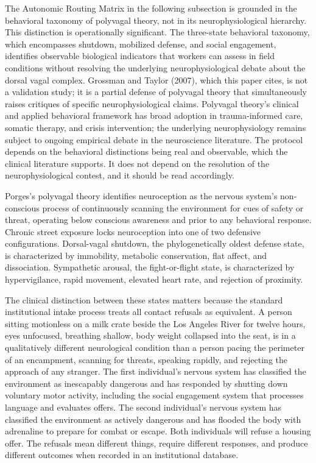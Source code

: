 \documentclass[12pt, letterpaper]{article}
\begin{document}
The Autonomic Routing Matrix in the following subsection is grounded in the behavioral taxonomy of polyvagal theory, not in its neurophysiological hierarchy. This distinction is operationally significant. The three-state behavioral taxonomy, which encompasses shutdown, mobilized defense, and social engagement, identifies observable biological indicators that workers can assess in field conditions without resolving the underlying neurophysiological debate about the dorsal vagal complex. Grossman and Taylor (2007), which this paper cites, is not a validation study; it is a partial defense of polyvagal theory that simultaneously raises critiques of specific neurophysiological claims. Polyvagal theory's clinical and applied behavioral framework has broad adoption in trauma-informed care, somatic therapy, and crisis intervention; the underlying neurophysiology remains subject to ongoing empirical debate in the neuroscience literature. The protocol depends on the behavioral distinctions being real and observable, which the clinical literature supports. It does not depend on the resolution of the neurophysiological contest, and it should be read accordingly.

Porges's polyvagal theory identifies neuroception as the nervous system's non-conscious process of continuously scanning the environment for cues of safety or threat, operating below conscious awareness and prior to any behavioral response. Chronic street exposure locks neuroception into one of two defensive configurations. Dorsal-vagal shutdown, the phylogenetically oldest defense state, is characterized by immobility, metabolic conservation, flat affect, and dissociation. Sympathetic arousal, the fight-or-flight state, is characterized by hypervigilance, rapid movement, elevated heart rate, and rejection of proximity.

The clinical distinction between these states matters because the standard institutional intake process treats all contact refusals as equivalent. A person sitting motionless on a milk crate beside the Los Angeles River for twelve hours, eyes unfocused, breathing shallow, body weight collapsed into the seat, is in a qualitatively different neurological condition than a person pacing the perimeter of an encampment, scanning for threats, speaking rapidly, and rejecting the approach of any stranger. The first individual's nervous system has classified the environment as inescapably dangerous and has responded by shutting down voluntary motor activity, including the social engagement system that processes language and evaluates offers. The second individual's nervous system has classified the environment as actively dangerous and has flooded the body with adrenaline to prepare for combat or escape. Both individuals will refuse a housing offer. The refusals mean different things, require different responses, and produce different outcomes when recorded in an institutional database.
\end{document}
